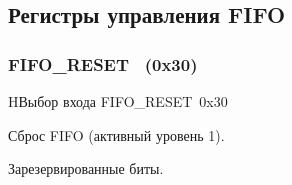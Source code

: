 


\subsection{Регистры управления FIFO}

\subsubsection{FIFO\_RESET~ (0x30)}
\renewcommand{\regnam}{FIFO\_RESET~}
\label{sec:FIFO_RESET}

\begin{register}{H}{Выбор входа \regnam}{0x30}

\label{regsamplecount}%
%
%
\regnewline%

\begin{regdesc}\begin{reglist}
\item [FIFO\_RESET (rw)]
Сброс FIFO (активный уровень 1).
\item [Reserved]
Зарезервированные биты.
\end{reglist}\end{regdesc}
\end{register}


